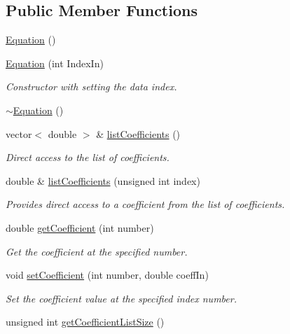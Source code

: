 \subsection*{Public Member Functions}
\begin{DoxyCompactItemize}
\item 
\hyperlink{class_equation_a68511fc719250ed80f86c50de9136733}{Equation} ()
\item 
\hyperlink{class_equation_a37fec641aec75302c37590d191421790}{Equation} (int Index\-In)
\begin{DoxyCompactList}\small\item\em Constructor with setting the data index. \end{DoxyCompactList}\item 
\hyperlink{class_equation_a097243d0dfd608330fc91f115a0d15bb}{$\sim$\-Equation} ()
\item 
vector$<$ double $>$ \& \hyperlink{class_equation_a4277bda09b538c1523d451afcc55787a}{list\-Coefficients} ()
\begin{DoxyCompactList}\small\item\em Direct access to the list of coefficients. \end{DoxyCompactList}\item 
double \& \hyperlink{class_equation_a198eb9e2816a5cd316b8bdc07d505568}{list\-Coefficients} (unsigned int index)
\begin{DoxyCompactList}\small\item\em Provides direct access to a coefficient from the list of coefficients. \end{DoxyCompactList}\item 
double \hyperlink{class_equation_a6aa77458d50e80de2a31708756c7925b}{get\-Coefficient} (int number)
\begin{DoxyCompactList}\small\item\em Get the coefficient at the specified number. \end{DoxyCompactList}\item 
void \hyperlink{class_equation_a96dd6f24624703a1ff3ffb4d19a76582}{set\-Coefficient} (int number, double coeff\-In)
\begin{DoxyCompactList}\small\item\em Set the coefficient value at the specified index number. \end{DoxyCompactList}\item 
unsigned int \hyperlink{class_equation_aa3ceaac689d9cfef1a1b3123d8ec4027}{get\-Coefficient\-List\-Size} ()
\item 

\end{DoxyCompactItemize}
